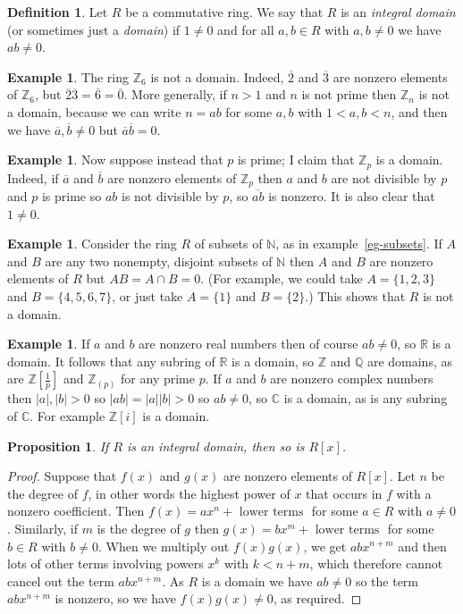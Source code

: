 \documentclass{amsart}
\newcommand{\Z}         {{\mathbb{Z}}}
\newcommand{\Q}         {{\mathbb{Q}}}
\newcommand{\R}         {{\mathbb{R}}}
\newcommand{\N}         {{\mathbb{N}}}
\newcommand{\C}         {{\mathbb{C}}}
\newcommand{\ov}[1]     {\overline{#1}}
\newcommand{\pinv}      {{\textstyle\frac{1}{p}}}
\renewcommand{\:}{\colon}
\newtheorem{proposition}[theorem]{Proposition}
\theoremstyle{definition}
\newtheorem{definition}[theorem]{Definition}
\newtheorem{example}[theorem]{Example}
\begin{document}
\begin{definition}
 Let $R$ be a commutative ring.  We say that $R$ is an \emph{integral
   domain} (or sometimes just a \emph{domain}) if $1\neq 0$ and for
 all $a,b\in R$ with $a,b\neq 0$ we have $ab\neq 0$.
\end{definition}
\begin{example}
 The ring $\Z_6$ is not a domain.  Indeed, $\ov{2}$ and $\ov{3}$ are
 nonzero elements of $\Z_6$, but $\ov{2}\ov{3}=\ov{6}=\ov{0}$.  More
 generally, if $n>1$ and $n$ is not prime then $\Z_n$ is not a domain,
 because we can write $n=ab$ for some $a,b$ with $1<a,b<n$, and then
 we have $\ov{a},\ov{b}\neq 0$ but $\ov{a}\ov{b}=0$.
\end{example}
\begin{example}
 Now suppose instead that $p$ is prime; I claim that $\Z_p$ is a
 domain.  Indeed, if $\ov{a}$ and $\ov{b}$ are nonzero elements of
 $\Z_p$ then $a$ and $b$ are not divisible by $p$ and $p$ is prime so
 $ab$ is not divisible by $p$, so $\ov{ab}$ is nonzero.  It is also
 clear that $1\neq 0$.
\end{example}
\begin{example}
 Consider the ring $R$ of subsets of $\N$, as in
 example~\ref{eg-subsets}.  If $A$ and $B$ are any two nonempty,
 disjoint subsets of $\N$ then $A$ and $B$ are nonzero elements of $R$
 but $AB=A\cap B=0$.  (For example, we could take $A=\{1,2,3\}$ and
 $B=\{4,5,6,7\}$, or just take $A=\{1\}$ and $B=\{2\}$.)  This shows
 that $R$ is not a domain.
\end{example}
\begin{example}
 If $a$ and $b$ are nonzero real numbers then of course $ab\neq 0$, so
 $\R$ is a domain.  It follows that any subring of $\R$ is a domain,
 so $\Z$ and $\Q$ are domains, as are $\Z[\pinv]$ and $\Z_{(p)}$ for
 any prime $p$.  If $a$ and $b$ are nonzero complex numbers then
 $|a|,|b|>0$ so $|ab|=|a||b|>0$ so $ab\neq 0$, so $\C$ is a domain, as
 is any subring of $\C$.  For example $\Z[i]$ is a domain.
\end{example}
\begin{proposition}
 If $R$ is an integral domain, then so is $R[x]$.
\end{proposition}
\begin{proof}
 Suppose that $f(x)$ and $g(x)$ are nonzero elements of $R[x]$.  Let
 $n$ be the degree of $f$, in other words the highest power of $x$
 that occurs in $f$ with a nonzero coefficient.  Then
 $f(x)=ax^n+\text{ lower terms }$ for some $a\in R$ with $a\neq 0$.
 Similarly, if $m$ is the degree of $g$ then $g(x)=bx^m + \text{ lower
 terms }$ for some $b\in R$ with $b\neq 0$.  When we multiply out
 $f(x)g(x)$, we get $abx^{n+m}$ and then lots of other terms involving
 powers $x^k$ with $k<n+m$, which therefore cannot cancel out the term
 $abx^{n+m}$.  As $R$ is a domain we have $ab\neq 0$ so the term
 $abx^{n+m}$ is nonzero, so we have $f(x)g(x)\neq 0$, as required.
\end{proof}
\end{document}
